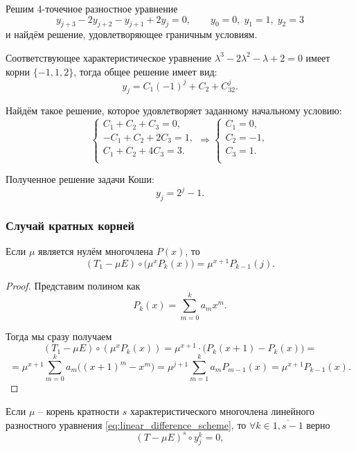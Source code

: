 \documentclass[../main.tex]{subfile}
\begin{document}
\begin{example}\label{eq:4dot_difference_equation}
	Решим 4-точечное разностное уравнение
	\[y_{j+3}-2y_{j+2}-y_{j+1}+2y_j=0,\qquad y_0=0,\;y_1=1,\;y_2=3\]
	и найдём решение, удовлетворяющее граничным условиям.

	Соответствующее характеристическое уравнение $\lambda^3-2\lambda^2-
	\lambda+2=0$ имеет корни $\{-1,1,2\}$, тогда общее решение имеет вид:
	\[y_j=C_1(-1)^j+C_2+C_32^j.\]

	Найдём такое решение, которое удовлетворяет заданному начальному
	условию:
	\[
		\begin{cases}
			C_1+C_2+C_3=0, \\
			-C_1+C_2+2C_3=1, \\
			C_1+C_2+4C_3=3. \\
		\end{cases}
		\Rightarrow
		\begin{cases}
			C_1=0, \\
			C_2=-1, \\
			C_3=1. \\
		\end{cases}
	\]

	Полученное решение задачи Коши:
	\[y_j=2^j-1.\]
\end{example}

\subsubsection{Случай кратных корней}
\begin{lemma}\label{eq:polynomial_power_lowering}
	Если $\mu$ является нулём многочлена $P(x)$, то
	\[(T_1-\mu E)\circ\big(\mu^xP_k(x)\big)=\mu^{x+1}P_{k-1}(j).\]
\end{lemma}

\begin{proof}
	Представим полином как
	\[P_k(x)=\sum_{m=0}^{k}a_mx^m.\]

	Тогда мы сразу получаем
	\[(T_1-\mu E)\circ(\mu^xP_k(x))=\mu^{x+1}\cdot\big(P_k(x+1)-P_k(x)
	\big)=\]
	\[=\mu^{x+1}\sum_{m=0}^{k}a_m\big((x+1)^m-x^m\big)=\mu^{j+1}\sum_{m=1}^
	{k}a_mP_{m-1}(x)=\mu^{x+1}P_{k-1}(x).\]
\end{proof}

\begin{lemma}\label{eq:characteristic_nullicifation}
	Если $\mu$ -- корень кратности $s$ характеристического многочлена
	линейного разностного уравнения \eqref{eq:linear_difference_scheme},
	то $\forall k\in\overline{1,s-1}$ верно
	\[(T-\mu E)^s\circ y_j^k=0,\]
\end{lemma}
\end{document}

